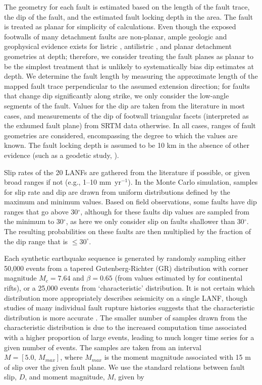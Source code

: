 \documentclass[draft,grl]{AGUTeX}
\begin{document}
\begin{article}
The geometry for each fault is estimated based on the length of the fault
trace, the dip of the fault, and the estimated fault locking depth in the area.
The fault is treated as planar for simplicity of calculations. Even though the
exposed footwalls of many detachment faults are non-planar, ample geologic and
geophysical evidence exists for listric \citep[e.g.][]{morley2009}, antilistric
\citep[e.g.][]{styron2013slr, fletcherspelz2009}, and planar
\citep[e.g.][]{mcgrew1993ssrd} detachment geometries at depth; therefore, we
consider treating the fault planes as planar to be the simplest treatment that
is unlikely to systematically bias dip estimates at depth. We determine the
fault length by measuring the approximate length of the mapped fault trace
perpendicular to the assumed extension direction; for faults that change dip
significantly along strike, we only consider the low-angle segments of the
fault. Values for the dip are taken from the literature in most cases, and
measurements of the dip of footwall triangular facets (interpreted as the
exhumed fault plane) from SRTM data otherwise. In all cases, ranges of fault
geometries are considered, encompassing the degree to which the values are
known. The fault locking depth is assumed to be 10 km in the absence of other
evidence (such as a geodetic study, \citep[e.g.,][]{hreinsdottir2009altotib}).

Slip rates of the 20 LANFs are gathered from the literature if possible, or
given broad ranges if not (e.g., 1--10 mm~yr$^{-1}$).  In the Monte Carlo
simulation, samples for slip rate and dip are drawn from uniform distributions
defined by the maximum and minimum values.  Based on field observations, some
faults have dip ranges that go above 30$^\circ$, although for these faults dip
values are sampled from the minimum to 30$^\circ$, as here we only consider
slip on faults shallower than 30$^\circ$. The resulting probabilities on these
faults are then multiplied by the fraction of the dip range that is
$\le30^\circ$.

Each synthetic earthquake sequence is generated by randomly sampling either
50,000 events from a tapered Gutenberg-Richter (GR) distribution with corner
magnitude $M_c = 7.64$ and $\beta = 0.65$ (from values estimated by
\citet{birdkagan2004f_m} for continental rifts), or a 25,000 events from
`characteristic' distribution. It is not certain which distribution more
appropriately describes seismicity on a single LANF, though studies of many
individual fault rupture histories suggests that the characteristic
distribution is more accurate \citep[e.g.,][]{hecker2013eqdist}.  The smaller
number of samples drawn from the characteristic distribution is due to the
increased computation time associated with a higher proportion of large events,
leading to much longer time series for a given number of events.  The samples
are taken from an interval $M = [5.0, \, M_{max}]$, where $M_{max}$ is the
moment magnitude associated with 15 m of slip over the given fault plane.  We
use the standard relations between fault slip, $D$, and moment magnitude, $M$,
given by


\end{article}
\end{document}
